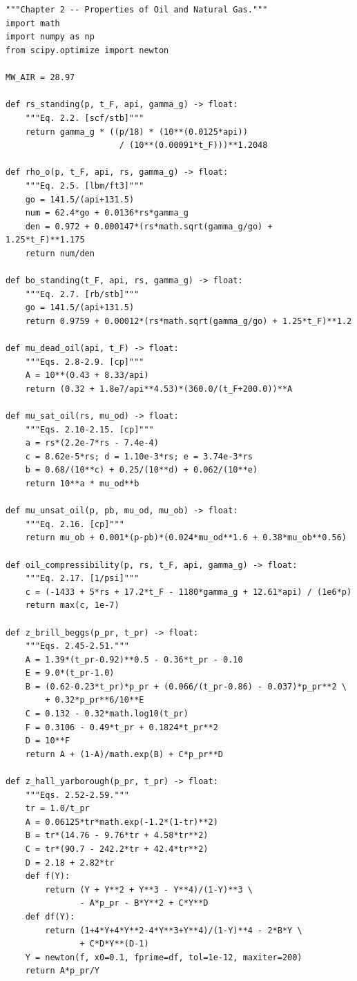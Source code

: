 \documentclass[10pt,a4paper,openany]{book}
\begin{document}
\chapter{}
\begin{lstlisting}
"""Chapter 2 -- Properties of Oil and Natural Gas."""
import math
import numpy as np
from scipy.optimize import newton

MW_AIR = 28.97

def rs_standing(p, t_F, api, gamma_g) -> float:
    """Eq. 2.2. [scf/stb]"""
    return gamma_g * ((p/18) * (10**(0.0125*api))
                       / (10**(0.00091*t_F)))**1.2048

def rho_o(p, t_F, api, rs, gamma_g) -> float:
    """Eq. 2.5. [lbm/ft3]"""
    go = 141.5/(api+131.5)
    num = 62.4*go + 0.0136*rs*gamma_g
    den = 0.972 + 0.000147*(rs*math.sqrt(gamma_g/go) + 1.25*t_F)**1.175
    return num/den

def bo_standing(t_F, api, rs, gamma_g) -> float:
    """Eq. 2.7. [rb/stb]"""
    go = 141.5/(api+131.5)
    return 0.9759 + 0.00012*(rs*math.sqrt(gamma_g/go) + 1.25*t_F)**1.2

def mu_dead_oil(api, t_F) -> float:
    """Eqs. 2.8-2.9. [cp]"""
    A = 10**(0.43 + 8.33/api)
    return (0.32 + 1.8e7/api**4.53)*(360.0/(t_F+200.0))**A

def mu_sat_oil(rs, mu_od) -> float:
    """Eqs. 2.10-2.15. [cp]"""
    a = rs*(2.2e-7*rs - 7.4e-4)
    c = 8.62e-5*rs; d = 1.10e-3*rs; e = 3.74e-3*rs
    b = 0.68/(10**c) + 0.25/(10**d) + 0.062/(10**e)
    return 10**a * mu_od**b

def mu_unsat_oil(p, pb, mu_od, mu_ob) -> float:
    """Eq. 2.16. [cp]"""
    return mu_ob + 0.001*(p-pb)*(0.024*mu_od**1.6 + 0.38*mu_ob**0.56)

def oil_compressibility(p, rs, t_F, api, gamma_g) -> float:
    """Eq. 2.17. [1/psi]"""
    c = (-1433 + 5*rs + 17.2*t_F - 1180*gamma_g + 12.61*api) / (1e6*p)
    return max(c, 1e-7)

def z_brill_beggs(p_pr, t_pr) -> float:
    """Eqs. 2.45-2.51."""
    A = 1.39*(t_pr-0.92)**0.5 - 0.36*t_pr - 0.10
    E = 9.0*(t_pr-1.0)
    B = (0.62-0.23*t_pr)*p_pr + (0.066/(t_pr-0.86) - 0.037)*p_pr**2 \
        + 0.32*p_pr**6/10**E
    C = 0.132 - 0.32*math.log10(t_pr)
    F = 0.3106 - 0.49*t_pr + 0.1824*t_pr**2
    D = 10**F
    return A + (1-A)/math.exp(B) + C*p_pr**D

def z_hall_yarborough(p_pr, t_pr) -> float:
    """Eqs. 2.52-2.59."""
    tr = 1.0/t_pr
    A = 0.06125*tr*math.exp(-1.2*(1-tr)**2)
    B = tr*(14.76 - 9.76*tr + 4.58*tr**2)
    C = tr*(90.7 - 242.2*tr + 42.4*tr**2)
    D = 2.18 + 2.82*tr
    def f(Y):
        return (Y + Y**2 + Y**3 - Y**4)/(1-Y)**3 \
               - A*p_pr - B*Y**2 + C*Y**D
    def df(Y):
        return (1+4*Y+4*Y**2-4*Y**3+Y**4)/(1-Y)**4 - 2*B*Y \
               + C*D*Y**(D-1)
    Y = newton(f, x0=0.1, fprime=df, tol=1e-12, maxiter=200)
    return A*p_pr/Y


\end{lstlisting}
\end{document}
